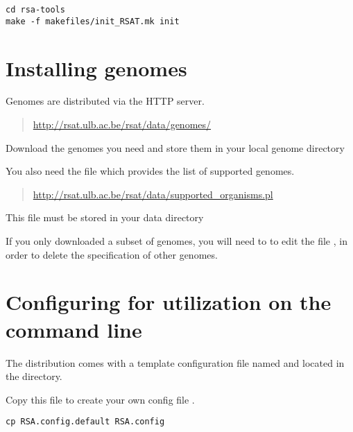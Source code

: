 \documentclass{article}
\begin{document}
\begin{verbatim}
cd rsa-tools
make -f makefiles/init_RSAT.mk init
\end{verbatim}


\section{Installing genomes}

Genomes are distributed via the HTTP server. 

\begin{quote}
\url{http://rsat.ulb.ac.be/rsat/data/genomes/}
\end{quote}

Download the genomes you need and store them in your local \RSAT
genome directory

\begin{quote}
\end{quote}

You also need the file which provides the list of supported genomes.

\begin{quote}
\url{http://rsat.ulb.ac.be/rsat/data/supported\_organisms.pl}
\end{quote}

This file must be stored in your \RSAT data directory

\begin{quote}
\end{quote}

If you only downloaded a subset of genomes, you will need to to edit
the file , in order to delete the
specification of other genomes.

\section{Configuring \RSAT for utilization on the command line}

The \RSAT distribution comes with a template configuration file named
 and located in the 
directory.

Copy this file to create your own config file .

\begin{verbatim}
cp RSA.config.default RSA.config
\end{verbatim}
\end{document}
